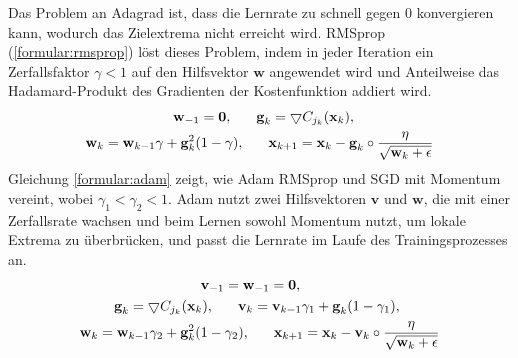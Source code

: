 Das Problem an Adagrad ist, dass die Lernrate zu schnell gegen 0 konvergieren kann, wodurch das Zielextrema nicht erreicht wird.
RMSprop (\ref{formular:rmsprop}) löst dieses Problem, indem in jeder Iteration ein Zerfallsfaktor $\gamma < 1$ auf den Hilfsvektor $\textbf{w}$ angewendet wird
und Anteilweise das Hadamard-Produkt des Gradienten der Kostenfunktion addiert wird.
\begin{align}
    \label{formular:rmsprop}
    \textbf{w}_{-1} = \textbf{0}, \hspace{0.6cm}
    \textbf{g}_k = \bigtriangledown C_{j_k}(\textbf{x}_k), \hspace{2cm} \nonumber\\
    \textbf{w}_k = \textbf{w}_{k-1}\gamma + \textbf{g}_k^2 (1-\gamma), \hspace{0.6cm}
    \textbf{x}_{k+1} = \textbf{x}_k - \textbf{g}_k \circ \frac{\eta}{\sqrt{\textbf{w}_k + \epsilon}}
\end{align}
Gleichung \ref{formular:adam} zeigt, wie Adam RMSprop und SGD mit Momentum vereint, wobei $\gamma_1 < \gamma_2 < 1$.
Adam nutzt zwei Hilfsvektoren $\textbf{v}$ und $\textbf{w}$, die mit einer Zerfallsrate wachsen und beim Lernen
sowohl Momentum nutzt, um lokale Extrema zu überbrücken, und passt die Lernrate im Laufe des Trainingsprozesses an.
\begin{align}
    \label{formular:adam}
    \textbf{v}_{-1} = \textbf{w}_{-1} = \textbf{0}, \hspace{3.5cm} \nonumber\\
    \textbf{g}_k = \bigtriangledown C_{j_k}(\textbf{x}_k), \hspace{0.6cm}
    \textbf{v}_k = \textbf{v}_{k-1}\gamma_1 + \textbf{g}_k (1-\gamma_1), \hspace{1cm} \nonumber\\
    \textbf{w}_k = \textbf{w}_{k-1}\gamma_2 + \textbf{g}_k^2 (1-\gamma_2), \hspace{0.6cm}
    \textbf{x}_{k+1} = \textbf{x}_k - \textbf{v}_k \circ \frac{\eta}{\sqrt{\textbf{w}_k + \epsilon}}
\end{align}


